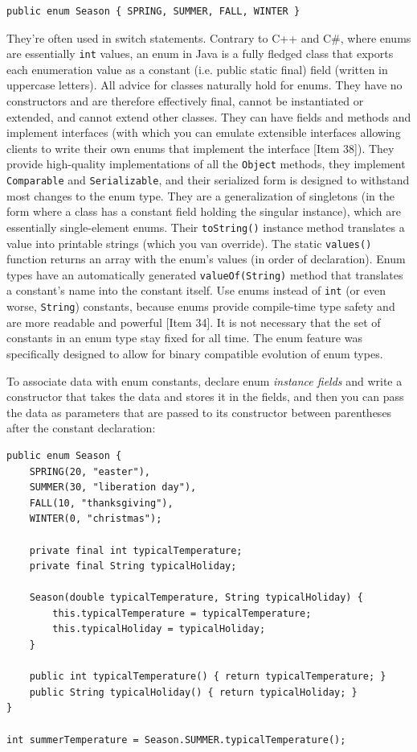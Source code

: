 \documentclass[table, xcdraw]{article}%
\begin{document}
\begin{verbatim}
public enum Season { SPRING, SUMMER, FALL, WINTER }
\end{verbatim}

They're often used in switch statements. Contrary to C++ and C\#, where enums are essentially \texttt{int} values, an enum in Java is a fully fledged class that exports each enumeration value as a constant (i.e. public static final) field (written in uppercase letters). All advice for classes naturally hold for enums. They have no constructors and are therefore effectively final, cannot be instantiated or extended, and cannot extend other classes. They can have fields and methods and implement interfaces (with which you can emulate extensible interfaces allowing clients to write their own enums that implement the interface [Item 38]). They provide high-quality implementations of all the \texttt{Object} methods, they implement \texttt{Comparable} and \texttt{Serializable}, and their serialized form is designed to withstand most changes to the enum type. They are a generalization of singletons (in the form where a class has a constant field holding the singular instance), which are essentially single-element enums. Their \texttt{toString()} instance method translates a value into printable strings (which you van override). The static \texttt{values()} function returns an array with the enum's values (in order of declaration). Enum types have an automatically generated \texttt{valueOf(String)} method that translates a constant's name into the constant itself. Use enums instead of \texttt{int} (or even worse, \texttt{String}) constants, because enums provide compile-time type safety and are more readable and powerful [Item 34]. It is not necessary that the set of constants in an enum type stay fixed for all time. The enum feature was specifically designed to allow for binary compatible evolution of enum types.

To associate data with enum constants, declare enum \emph{instance fields} and write a constructor that takes the data and stores it in the fields, and then you can pass the data as parameters that are passed to its constructor between parentheses after the constant declaration:

\begin{verbatim}
public enum Season {
    SPRING(20, "easter"),
    SUMMER(30, "liberation day"),
    FALL(10, "thanksgiving"),
    WINTER(0, "christmas");

    private final int typicalTemperature;
    private final String typicalHoliday;

    Season(double typicalTemperature, String typicalHoliday) {
        this.typicalTemperature = typicalTemperature;
        this.typicalHoliday = typicalHoliday;
    }
    
    public int typicalTemperature() { return typicalTemperature; }
    public String typicalHoliday() { return typicalHoliday; }
}

int summerTemperature = Season.SUMMER.typicalTemperature();
\end{verbatim}
\end{document}
